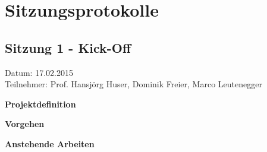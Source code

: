\chapter{Sitzungsprotokolle}
\label{chap:Sitzungsprotokolle}
\section{Sitzung 1 - Kick-Off}
Datum: 17.02.2015 \\
Teilnehmer: Prof. Hansjörg Huser, Dominik Freier, Marco Leutenegger

\textbf{Projektdefinition}

\textbf{Vorgehen}

\textbf{Anstehende Arbeiten}